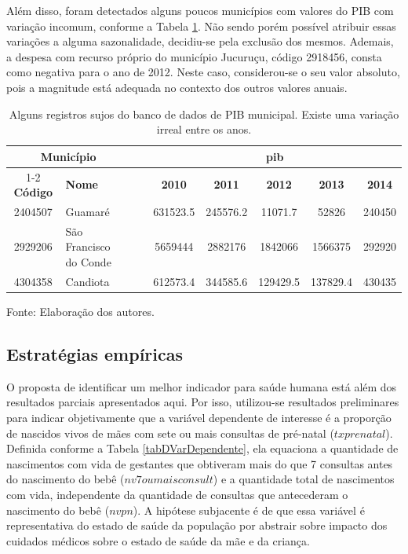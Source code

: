 \documentclass[twoside,onecolumn,12pt]{article}
\numberwithin{outputctr}{section}
\begin{document}
Al\'{e}m disso, foram detectados alguns poucos municípios com valores do PIB com variação incomum, conforme a Tabela \ref{tabBdSujo_pib}. Não sendo porém possível atribuir essas variações a alguma sazonalidade, decidiu-se pela exclusão dos mesmos. Ademais, a despesa com recurso pr\'{o}prio do munic\'{i}pio Jucuru\c{c}u, c\'{o}digo 2918456, consta como negativa para o ano de 2012.  Neste caso, considerou-se o seu valor absoluto, pois a magnitude est\'{a} adequada no contexto dos outros valores anuais.

\begin{table}[htbp]\centering \caption{Alguns registros sujos do banco de dados de PIB municipal. Existe uma varia\c{c}\~{a}o irreal entre os anos. \label{tabBdSujo_pib}}
\begin{tabular}{c l c c c c c c}\hline\hline
\multicolumn{2}{c}{\textbf{Munic\'{i}pio}} & ~ & \multicolumn{5}{c}{\textbf{pib}} \\ \cline{1-2} \cline{4-8}
\textbf{C\'{o}digo} & \textbf{Nome} & ~ & \textbf{2010} & \textbf{2011} & \textbf{2012} & \textbf{2013} & \textbf{2014} \\
\hline
2404507 & Guamar\'{e} & ~ & 631523.5 & 245576.2 & 11071.7 & 52826 & 240450 \\
2929206 & S\~{a}o Francisco do Conde & ~ & 5659444 & 2882176 & 1842066 & 1566375 & 292920 \\
4304358 & Candiota & ~ & 612573.4 & 344585.6 & 129429.5 & 137829.4 & 430435 \\
\hline
\end{tabular}
\begin{tablenotes}
\item \tiny{Fonte: Elaboração dos autores.}
\end{tablenotes}
\end{table}


\subsection{Estrat\'{e}gias emp\'{i}ricas}\label{secEstrategiaEmp}

O proposta de identificar um melhor indicador para saúde humana está além dos resultados parciais apresentados aqui. Por isso, utilizou-se resultados preliminares para indicar objetivamente que a vari\'{a}vel dependente de interesse \'{e} a propor\c{c}\~{a}o de nascidos vivos de m\~{a}es com sete ou mais consultas de pr\'{e}-natal ($txprenatal$). Definida conforme a Tabela \ref{tabDVarDependente}, ela equaciona a quantidade de nascimentos com vida de gestantes que obtiveram mais do que 7 consultas antes do nascimento do beb\^{e} ($nv7oumaisconsult$) e a quantidade total de nascimentos com vida, independente da quantidade de consultas que antecederam o nascimento do beb\^{e} ($nvpn$). A hipótese subjacente é de que essa variável é representativa do estado de saúde da população por abstrair sobre impacto dos cuidados médicos sobre o estado de saúde da mãe e da criança.
\end{document}
